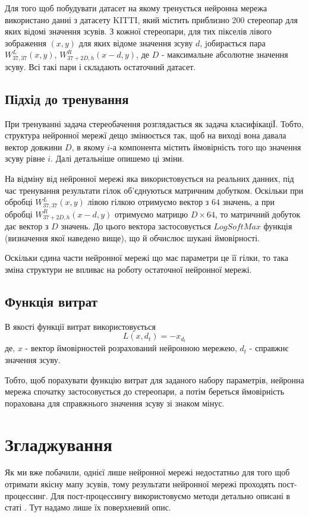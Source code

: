 \documentclass{article}
\theoremstyle{definition}
\begin{document}
Для того щоб побудувати датасет на якому тренується нейронна мережа використано данні з датасету KITTI, який містить приблизно 200 стереопар для яких відомі значення зсувів. З кожної стереопари, для тих пікселів лівого зображення $(x, y)$ для яких відоме значення зсуву $d$, jобирається пара $W^L_{37,37}(x,y)$, $W^R_{37 + 2D,h}(x - d,y)$, де $D$ - максимальне абсолютне значення зсуву. Всі такі пари і складають остаточний датасет.

\subsection{Підхід до тренування}
При тренуванні задача стереобачення розглядається як задача класифікаціЇ. Тобто, структура нейронної мережї дещо змінюється так, щоб на виході вона давала вектор довжини $D$, в якому $i$-а компонента містить ймовірність того що значення зсуву рівне $i$. Далі детальніше опишемо ці зміни.
  
На відміну від нейронної мережі яка використовується на реальних данних, під час тренування результати гілок об'єднуються матричним добутком. Оскільки при обробці $W^L_{37,37}(x,y)$ лівою гілкою отримуємо вектор з $64$ значень, а при обробці $W^R_{37 + 2D,h}(x - d,y)$  отримуємо матрицю $D \times 64$, то матричний добуток дає вектор з $D$ значень. До цього вектора застосовується $LogSoftMax$ функція (визначення якої наведено вище), що й обчислює шукані ймовірності.

Оскільки єдина части нейронної мережі що має параметри це її гілки, то така зміна структури не впливає на роботу остаточної нейронної мережі.

\subsection{Функція витрат}
В якості функції витрат використовується
\[ L(x, d_t) = -x_{d_t} \]
де, $x$ - вектор ймовірностей розрахований нейронною мережею, $d_t$ - справжнє значення зсуву.

Тобто, щоб порахувати функцію витрат для заданого набору параметрів, нейронна мережа спочатку застосовується до стереопари, а потім береться ймовірність порахована для справжнього значення зсуву зі знаком мінус.

\section{Згладжування}
Як ми вже побачили, однієї лише нейронної мережі недостатньо для того щоб отримати якісну мапу зсувів, тому результати нейронної мережі проходять пост-процессинг. Для пост-процессингу використовуємо методи детально описані в статі \cite{zbontar2016stereo}. Тут надамо лише їх поверхневий опис.
\end{document}
